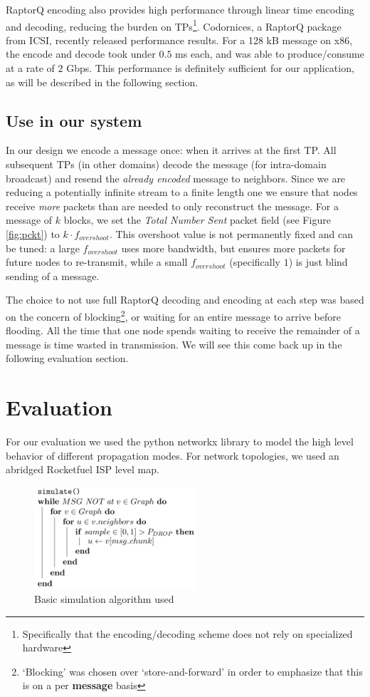 RaptorQ encoding also provides high performance through linear time encoding and decoding, reducing the burden on TPs\footnote{Specifically that the encoding/decoding scheme does not rely on specialized hardware}. Codornices, a RaptorQ package from ICSI, recently released performance results. For a 128 kB message on x86, the encode and decode took under $0.5$ ms each, and was able to produce/consume at a rate of $2$ Gbps\cite{raptorqperf}. This performance is definitely sufficient for our application, as will be described in the following section.

\subsection{Use in our system}
In our design we encode a message once: when it arrives at the first TP. All subsequent TPs (in other domains) decode the message (for intra-domain broadcast) and resend the \textit{already encoded} message to neighbors. Since we are reducing a potentially infinite stream to a finite length one we ensure that nodes receive \textit{more} packets than are needed to only reconstruct the message. For a message of $k$ blocks, we set the \textit{Total Number Sent} packet field (see Figure \ref{fig:pckt}) to $k\cdot f_{overshoot}$. This overshoot value is not permanently fixed and can be tuned: a large $f_{overshoot}$ uses more bandwidth, but ensures more packets for future nodes to re-transmit, while a small $f_{overshoot}$ (specifically $1$) is just blind sending of a message.

The choice to not use full RaptorQ decoding and encoding at each step was based on the concern of blocking\footnote{`Blocking' was chosen over `store-and-forward' in order to emphasize that this is on a per \textbf{message} basis}, or waiting for an entire message to arrive before flooding. All the time that one node spends waiting to receive the remainder of a message is time wasted in transmission. We will see this come back up in the following evaluation section.

\section{Evaluation}
For our evaluation we used the python networkx library to model the high level behavior of different propagation modes.\cite{nwx}
For network topologies, we used an abridged Rocketfuel ISP level map. \cite{rocketfuel}

\begin{figure}[tp]
\centering
\includegraphics[width=6cm]{figures/algo_v2.png}
\caption{Basic simulation algorithm used}
\label{algo:a1}
\end{figure}


